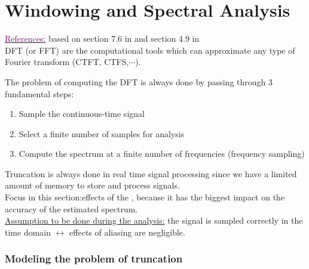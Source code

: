 

\chapter{Windowing and Spectral Analysis}
\label{Chap:Windowing}

\underline{\textcolor{purple}{References}:} based on section 7.6 in \cite{DSP_DimitrisManolakis} and section 4.9 in \cite{signal_processing_Lathi}\\

DFT (or FFT) are the computational tools which can approximate any type of Fourier transform (CTFT, CTFS,$\cdots$).

The problem of computing the DFT is always done by passing through 3 fundamental steps:

	\begin{enumerate}
	\item Sample the continuous-time signal
	
	\item Select a finite number of samples for analysis
	
	\item Compute the spectrum at a finite
number of frequencies (frequency sampling)
	\end{enumerate}

Truncation is always done in real time signal processing since we have a limited amount of memory to store and process signals.\\

Focus in this section:effects of the , because it
has the biggest impact on the accuracy of the estimated spectrum.\\

\underline{Assumption to be done during the analysis:}  the signal is sampled correctly in the time domain $\leftrightarrow$ effects of aliasing are negligible.


\subsection{Modeling the problem of truncation}

